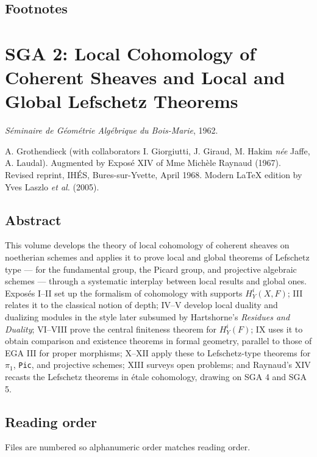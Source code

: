 \documentclass[
]{article}
\begin{document}
\subsection{Footnotes}\label{footnotes-2}

\section{SGA 2: Local Cohomology of Coherent Sheaves and Local and
Global Lefschetz
Theorems}\label{sga-2-local-cohomology-of-coherent-sheaves-and-local-and-global-lefschetz-theorems-1}

\emph{Séminaire de Géométrie Algébrique du Bois-Marie}, 1962.

A. Grothendieck (with collaborators I. Giorgiutti, J. Giraud, M. Hakim
\emph{née} Jaffe, A. Laudal). Augmented by Exposé XIV of Mme Michèle
Raynaud (1967). Revised reprint, IHÉS, Bures-sur-Yvette, April 1968.
Modern LaTeX edition by Yves Laszlo \emph{et al.} (2005).

\subsection{Abstract}\label{abstract}

This volume develops the theory of local cohomology of coherent sheaves
on noetherian schemes and applies it to prove local and global theorems
of Lefschetz type --- for the fundamental group, the Picard group, and
projective algebraic schemes --- through a systematic interplay between
local results and global ones. Exposés I--II set up the formalism of
cohomology with supports \(H^{i}_{Y}(X, F)\); III relates it to the
classical notion of depth; IV--V develop local duality and dualizing
modules in the style later subsumed by Hartshorne's \emph{Residues and
Duality}; VI--VIII prove the central finiteness theorem for
\(H^{i}_{Y}(F)\); IX uses it to obtain comparison and existence theorems
in formal geometry, parallel to those of EGA III for proper morphisms;
X--XII apply these to Lefschetz-type theorems for \(\pi_{1}\),
\texttt{Pic}, and projective schemes; XIII surveys open problems; and
Raynaud's XIV recasts the Lefschetz theorems in étale cohomology,
drawing on SGA 4 and SGA 5.

\subsection{Reading order}\label{reading-order}

Files are numbered so alphanumeric order matches reading order.
\end{document}
